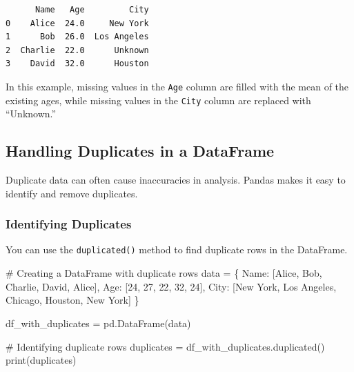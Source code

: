 \documentclass[
  letterpaper,
  DIV=11,
  numbers=noendperiod]{scrreprt}
\newenvironment{Shaded}{\begin{snugshade}}{\end{snugshade}}
\newcommand{\BuiltInTok}[1]{\textcolor[rgb]{0.00,0.23,0.31}{#1}}
\newcommand{\CommentTok}[1]{\textcolor[rgb]{0.37,0.37,0.37}{#1}}
\newcommand{\DecValTok}[1]{\textcolor[rgb]{0.68,0.00,0.00}{#1}}
\newcommand{\NormalTok}[1]{\textcolor[rgb]{0.00,0.23,0.31}{#1}}
\newcommand{\OperatorTok}[1]{\textcolor[rgb]{0.37,0.37,0.37}{#1}}
\newcommand{\StringTok}[1]{\textcolor[rgb]{0.13,0.47,0.30}{#1}}
\begin{document}
\begin{verbatim}
      Name   Age         City
0    Alice  24.0     New York
1      Bob  26.0  Los Angeles
2  Charlie  22.0      Unknown
3    David  32.0      Houston
\end{verbatim}

In this example, missing values in the \texttt{Age} column are filled
with the mean of the existing ages, while missing values in the
\texttt{City} column are replaced with ``Unknown.''

\hypertarget{handling-duplicates-in-a-dataframe}{%
\subsection{Handling Duplicates in a
DataFrame}\label{handling-duplicates-in-a-dataframe}}

Duplicate data can often cause inaccuracies in analysis. Pandas makes it
easy to identify and remove duplicates.

\hypertarget{identifying-duplicates-1}{%
\subsubsection{Identifying Duplicates}\label{identifying-duplicates-1}}

You can use the \texttt{duplicated()} method to find duplicate rows in
the DataFrame.

\begin{Shaded}
\begin{Highlighting}[]
\CommentTok{\# Creating a DataFrame with duplicate rows}
\NormalTok{data }\OperatorTok{=}\NormalTok{ \{}
    \StringTok{\textquotesingle{}Name\textquotesingle{}}\NormalTok{: [}\StringTok{\textquotesingle{}Alice\textquotesingle{}}\NormalTok{, }\StringTok{\textquotesingle{}Bob\textquotesingle{}}\NormalTok{, }\StringTok{\textquotesingle{}Charlie\textquotesingle{}}\NormalTok{, }\StringTok{\textquotesingle{}David\textquotesingle{}}\NormalTok{, }\StringTok{\textquotesingle{}Alice\textquotesingle{}}\NormalTok{],}
    \StringTok{\textquotesingle{}Age\textquotesingle{}}\NormalTok{: [}\DecValTok{24}\NormalTok{, }\DecValTok{27}\NormalTok{, }\DecValTok{22}\NormalTok{, }\DecValTok{32}\NormalTok{, }\DecValTok{24}\NormalTok{],}
    \StringTok{\textquotesingle{}City\textquotesingle{}}\NormalTok{: [}\StringTok{\textquotesingle{}New York\textquotesingle{}}\NormalTok{, }\StringTok{\textquotesingle{}Los Angeles\textquotesingle{}}\NormalTok{, }\StringTok{\textquotesingle{}Chicago\textquotesingle{}}\NormalTok{, }\StringTok{\textquotesingle{}Houston\textquotesingle{}}\NormalTok{, }\StringTok{\textquotesingle{}New York\textquotesingle{}}\NormalTok{]}
\NormalTok{\}}

\NormalTok{df\_with\_duplicates }\OperatorTok{=}\NormalTok{ pd.DataFrame(data)}

\CommentTok{\# Identifying duplicate rows}
\NormalTok{duplicates }\OperatorTok{=}\NormalTok{ df\_with\_duplicates.duplicated()}
\BuiltInTok{print}\NormalTok{(duplicates)}
\end{Highlighting}
\end{Shaded}
\end{document}
